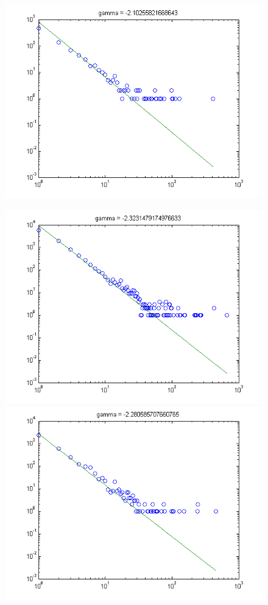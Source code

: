 \documentclass[11pt,a4paper,twocolumn]{article}
\begin{document}
\begin{singlespace}
\begin{figure}
\includegraphics[scale=0.5]{images/JUNIT}

\includegraphics[scale=0.5]{images/logisim}
\includegraphics[scale=0.5]{images/MARS}


\end{figure}
\end{singlespace}
\end{document}

